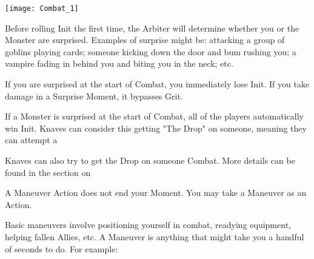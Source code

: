 {  

     \begin{center}
  \texttt{[image: Combat\_1]}
  \end{center}


  Before rolling Init the first time, the Arbiter will determine whether you or the Monster are surprised. Examples of surprise might be: attacking a group of goblins playing cards; someone kicking down the door and bum rushing you; a vampire fading in behind you and biting you in the neck; etc.

  If you are surprised at the start of Combat, you immediately lose Init. If you take damage in a Surprise Moment, it bypasses Grit.

  If a Monster is surprised at the start of Combat, all of the players automatically win Init.  Knaves can consider this getting "The Drop" on someone, meaning they can attempt a 

  Knaves can also try to get the Drop on someone  Combat.  More details can be found in the section on 


  A Maneuver Action does not end your Moment.  You may take a Maneuver as an Action.  


  Basic maneuvers involve positioning yourself in combat, readying equipment, helping fallen Allies, etc.  A Maneuver is anything that might take you a handful of seconds to do.  For example:

}
